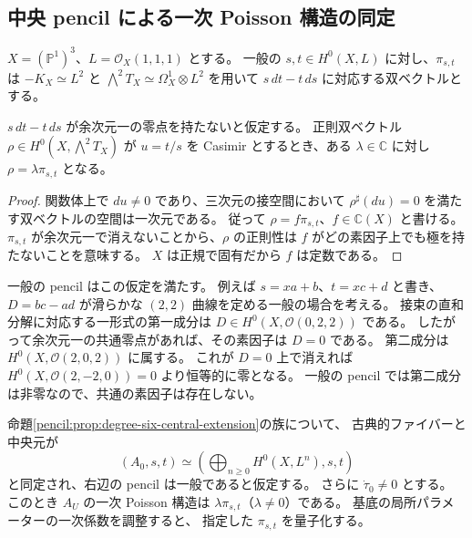 \subsection{中央 pencil による一次 Poisson 構造の同定}
\label{pencil:subsec:semiclassical}

$X=(\mathbb P^1)^3$、$L=\mathcal O_X(1,1,1)$ とする。
一般の $s,t\in H^0(X,L)$ に対し、$\pi_{s,t}$ は
$-K_X\simeq L^2$ と
$\bigwedge^2T_X\simeq\Omega_X^1\otimes L^2$ を用いて
$s\,dt-t\,ds$ に対応する双ベクトルとする。

\begin{lemma}\label{pencil:lem:central-pencil-poisson}
$s\,dt-t\,ds$ が余次元一の零点を持たないと仮定する。
正則双ベクトル $\rho\in H^0(X,\bigwedge^2T_X)$ が
$u=t/s$ を Casimir とするとき、ある $\lambda\in\mathbb C$ に対し
$\rho=\lambda\pi_{s,t}$ となる。
\end{lemma}

\begin{proof}
関数体上で $du\ne0$ であり、三次元の接空間において
$\rho^\sharp(du)=0$ を満たす双ベクトルの空間は一次元である。
従って $\rho=f\pi_{s,t}$、$f\in\mathbb C(X)$ と書ける。
$\pi_{s,t}$ が余次元一で消えないことから、$\rho$ の正則性は
$f$ がどの素因子上でも極を持たないことを意味する。
$X$ は正規で固有だから $f$ は定数である。
\end{proof}

一般の pencil はこの仮定を満たす。
例えば $s=xa+b$、$t=xc+d$ と書き、
$D=bc-ad$ が滑らかな $(2,2)$ 曲線を定める一般の場合を考える。
接束の直和分解に対応する一形式の第一成分は
$D\in H^0(X,\mathcal O(0,2,2))$ である。
したがって余次元一の共通零点があれば、その素因子は $D=0$ である。
第二成分は $H^0(X,\mathcal O(2,0,2))$ に属する。
これが $D=0$ 上で消えれば
$H^0(X,\mathcal O(2,-2,0))=0$ より恒等的に零となる。
一般の pencil では第二成分は非零なので、共通の素因子は存在しない。

\begin{proposition}\label{pencil:prop:semiclassical-identification}
命題\ref{pencil:prop:degree-six-central-extension}の族について、
古典的ファイバーと中央元が
\[
 (A_0,s,t)\simeq
 \left(\bigoplus_{n\geq0}H^0(X,L^n),s,t\right)
\]
と同定され、右辺の pencil は一般であると仮定する。
さらに $\dot\tau_0\ne0$ とする。
このとき $A_U$ の一次 Poisson 構造は
$\lambda\pi_{s,t}$（$\lambda\ne0$）である。
基底の局所パラメーターの一次係数を調整すると、
指定した $\pi_{s,t}$ を量子化する。
\end{proposition}

